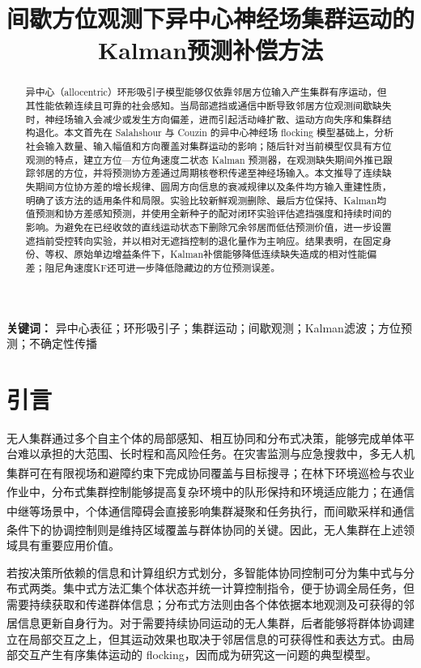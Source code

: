 \documentclass[UTF8,fontset=windows,11pt]{ctexart}
\title{\bfseries 间歇方位观测下异中心神经场集群运动的\newline Kalman预测补偿方法}
\author{}
\date{}
\newcommand{\upcite}[1]{\textsuperscript{\cite{#1}}}
\begin{document}
\maketitle

\begin{abstract}
异中心（allocentric）环形吸引子模型能够仅依靠邻居方位输入产生集群有序运动，但其性能依赖连续且可靠的社会感知。当局部遮挡或通信中断导致邻居方位观测间歇缺失时，神经场输入会减少或发生方向偏差，进而引起活动峰扩散、运动方向失序和集群结构退化。本文首先在 Salahshour 与 Couzin 的异中心神经场 flocking 模型基础上，分析社会输入数量、输入幅值和方向覆盖对集群运动的影响；随后针对当前模型仅具有方位观测的特点，建立方位—方位角速度二状态 Kalman 预测器，在观测缺失期间外推已跟踪邻居的方位，并将预测协方差通过周期核卷积传递至神经场输入。本文推导了连续缺失期间方位协方差的增长规律、圆周方向信息的衰减规律以及条件均方输入重建性质，明确了该方法的适用条件和局限。实验比较新鲜观测删除、最后方位保持、Kalman均值预测和协方差感知预测，并使用全新种子的配对闭环实验评估遮挡强度和持续时间的影响。为避免在已经收敛的直线运动状态下删除冗余邻居而低估预测价值，进一步设置遮挡前受控转向实验，并以相对无遮挡控制的退化量作为主响应。结果表明，在固定身份、等权、原始单边增益条件下，Kalman补偿能够降低连续缺失造成的相对性能偏差；阻尼角速度KF还可进一步降低隐藏边的方位预测误差。
\end{abstract}

\noindent\textbf{关键词：} 异中心表征；环形吸引子；集群运动；间歇观测；Kalman滤波；方位预测；不确定性传播

\section{引言}

无人集群通过多个自主个体的局部感知、相互协同和分布式决策，能够完成单体平台难以承担的大范围、长时程和高风险任务。在灾害监测与应急搜救中，多无人机集群可在有限视场和避障约束下完成协同覆盖与目标搜寻\upcite{Bai2024}；在林下环境巡检与农业作业中，分布式集群控制能够提高复杂环境中的队形保持和环境适应能力\upcite{Boldrer2026}；在通信中继等场景中，个体通信障碍会直接影响集群凝聚和任务执行\upcite{LiFlocking2024}，而间歇采样和通信条件下的协调控制则是维持区域覆盖与群体协同的关键\upcite{Ge2025Coordination}。因此，无人集群在上述领域具有重要应用价值。

若按决策所依赖的信息和计算组织方式划分，多智能体协同控制可分为集中式与分布式两类。集中式方法汇集个体状态并统一计算控制指令，便于协调全局任务，但需要持续获取和传递群体信息；分布式方法则由各个体依据本地观测及可获得的邻居信息更新自身行为\upcite{OlfatiSaber2006}。对于需要持续协同运动的无人集群，后者能够将群体协调建立在局部交互之上，但其运动效果也取决于邻居信息的可获得性和表达方式。由局部交互产生有序集体运动的 flocking，因而成为研究这一问题的典型模型。
\end{document}
